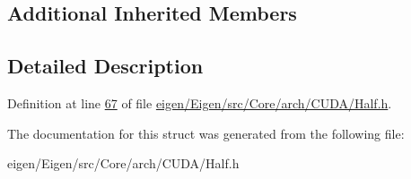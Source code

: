 \subsection*{Additional Inherited Members}


\subsection{Detailed Description}


Definition at line \hyperlink{eigen_2_eigen_2src_2_core_2arch_2_c_u_d_a_2_half_8h_source_l00067}{67} of file \hyperlink{eigen_2_eigen_2src_2_core_2arch_2_c_u_d_a_2_half_8h_source}{eigen/\+Eigen/src/\+Core/arch/\+C\+U\+D\+A/\+Half.\+h}.



The documentation for this struct was generated from the following file\+:\begin{DoxyCompactItemize}
\item 
eigen/\+Eigen/src/\+Core/arch/\+C\+U\+D\+A/\+Half.\+h\end{DoxyCompactItemize}

